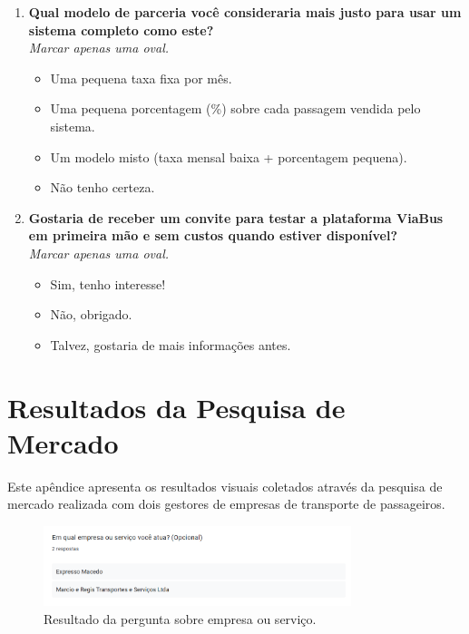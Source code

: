 \begin{apendicesenv}
\begin{enumerate}
    \item \textbf{Qual modelo de parceria você consideraria mais justo para usar um sistema completo como este?} \\
          \textit{Marcar apenas uma oval.}
          \begin{itemize}
            \item Uma pequena taxa fixa por mês.
            \item Uma pequena porcentagem (\%) sobre cada passagem vendida pelo sistema.
            \item Um modelo misto (taxa mensal baixa + porcentagem pequena).
            \item Não tenho certeza.
          \end{itemize}

    \item \textbf{Gostaria de receber um convite para testar a plataforma ViaBus em primeira mão e sem custos quando estiver disponível?} \\
          \textit{Marcar apenas uma oval.}
          \begin{itemize}
            \item Sim, tenho interesse!
            \item Não, obrigado.
            \item Talvez, gostaria de mais informações antes.
          \end{itemize}
  \end{enumerate}


  \chapter{Resultados da Pesquisa de Mercado}
  \label{apendice:resultados}

  Este apêndice apresenta os resultados visuais coletados através da pesquisa de mercado realizada com dois gestores de empresas de transporte de passageiros.

  \begin{figure}[htbp]
    \centering
    \includegraphics[width=0.8\textwidth]{imagens/imagem1.png}
    \caption{Resultado da pergunta sobre empresa ou serviço.}
    \label{fig:resultado1}
  \end{figure}


\end{apendicesenv}
